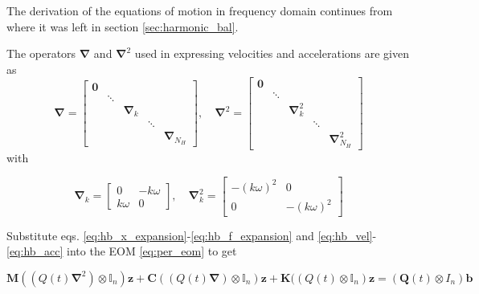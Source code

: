 The derivation of the equations of motion in frequency domain continues from
where it was left in section \ref{sec:harmonic_bal}.

The operators $\bm \nabla$ and $\bm \nabla^2$ used in expressing velocities and
accelerations are given as
\begin{equation}
  \label{eq:hb_nabla}
  \bm \nabla =
  \begin{bmatrix}
    \bm 0 &        &                &        & \\
          & \ddots &                &        & \\
          &        & \bm \nabla_k   &        & \\
          &        &                & \ddots & \\
          &        &                &        & \bm \nabla_{N_H}
  \end{bmatrix}, \quad
  \bm \nabla^2 =
  \begin{bmatrix}
    \bm 0 &        &                &        & \\
          & \ddots &                &        & \\
          &        & \bm \nabla^2_k &        & \\
          &        &                & \ddots & \\
          &        &                &        & \bm \nabla^2_{N_H}
  \end{bmatrix}
\end{equation}
with

\begin{equation}
  \label{eq:hb_nabla2}
  \bm \nabla_k =
  \begin{bmatrix}
    0       & -k\omega \\
    k\omega & 0
  \end{bmatrix}, \quad
  \bm \nabla^2_k =
  \begin{bmatrix}
    -(k\omega)^2 & 0 \\
    0            & -(k\omega)^2
  \end{bmatrix}
\end{equation}

Substitute eqs. \eqref{eq:hb_x_expansion}-\eqref{eq:hb_f_expansion} and
\eqref{eq:hb_vel}-\eqref{eq:hb_acc} into the EOM \eqref{eq:per_eom} to get

\begin{equation}
  \label{eq:hb_eom_subs}
  \bm M((Q(t)\bm\nabla^2) \otimes \mathbb{I}_n)\bm z  +
  \bm C((Q(t)\bm\nabla) \otimes \mathbb{I}_n)\bm z  +
  \bm K((Q(t) \otimes \mathbb{I}_n)\bm z  =
  (\bm Q(t)\otimes I_n) \bm b
\end{equation}

